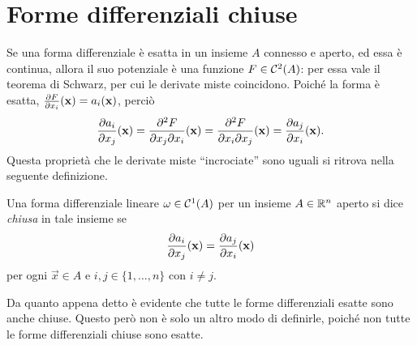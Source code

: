 \section{Forme differenziali chiuse}
Se una forma differenziale è esatta in un insieme $A$ connesso e aperto, ed essa è continua, allora il suo potenziale è una funzione $F\in\mathcal{C}^{{2}}(A)$: per essa vale il teorema di Schwarz, per cui le derivate miste coincidono.
Poiché la forma è esatta, $\frac{\partial {F}}{\partial {x_i}}(\mathbf{x})=a_i(\mathbf{x})$, perciò
\begin{equation}
	\frac{\partial {a_i}}{\partial {x_j}}(\mathbf{x})=\frac{\partial^2 F}{\partial x_j\partial x_i}(\mathbf{x})=\frac{\partial^2 F}{\partial x_i\partial x_j}(\mathbf{x})=\frac{\partial {a_j}}{\partial {x_i}}(\mathbf{x}).
\end{equation}
Questa proprietà che le derivate miste ``incrociate'' sono uguali si ritrova nella seguente definizione.
\begin{definizione} \label{d:forma-diff-chiusa}
	Una forma differenziale lineare $\omega\in\mathcal{C}^{{1}}(A)$ per un insieme $A\in\mathbb{R}^n$ aperto si dice \emph{chiusa} in tale insieme se
	\begin{equation}
		\frac{\partial {a_i}}{\partial {x_j}}(\mathbf{x})=\frac{\partial {a_j}}{\partial {x_i}}(\mathbf{x})
	\end{equation}
	per ogni $\vec x\in A$ e $i,j\in\{1,\dots,n\}$ con $i\neq j$.
\end{definizione}
Da quanto appena detto è evidente che tutte le forme differenziali esatte sono anche chiuse.
Questo però non è solo un altro modo di definirle, poiché non tutte le forme differenziali chiuse sono esatte.
